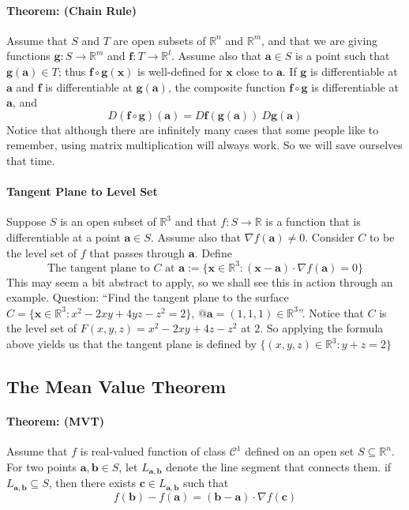 \documentclass[12pt]{article}
\newcommand{\real}{\mathbb{R}}
\newcommand{\va}{\mathbf{a}}
\newcommand{\vb}{\mathbf{b}}
\newcommand{\vx}{\mathbf{x}}
\newcommand{\vc}{\mathbf{c}}
\newcommand{\ba}{\mathbf{a}}
\newcommand{\boldf}{\mathbf{f}}
\newcommand{\bg}{\mathbf{g}}
\begin{document}
\paragraph{Theorem: (Chain Rule)} Assume that $S$ and $T$ are open subsets of $\real^n$ and $\real^m$, and that we are giving functions $\mathbf{g}:S\to \real^m$ and $\boldf: T\to \real^l$. Assume also that $\va\in S$ is a point such that $\mathbf{g}(\va)\in T$; thus $\boldf\circ \mathbf{g}(\vx)$ is well-defined for $\vx$ close to $\va$. If $\mathbf{g}$ is differentiable at $\va$ and $\boldf$ is differentiable at $\mathbf{g}(\va)$, the composite function $\boldf\circ\mathbf{g}$ is differentiable at $\va$, and
\begin{equation*}
    \boxed{ D(\boldf\circ\mathbf{g})(\ba) = D\boldf(\mathbf{g}(\ba)) \ D\bg(\ba)}
\end{equation*}
Notice that although there are infinitely many cases that some people like to remember, using matrix multiplication will always work. So we will save ourselves that time.

\paragraph{Tangent Plane to Level Set} Suppose $S$ is an open subset of $\real^3$ and that $f:S\to \real$ is a function that is differentiable at a point $\va\in S$. Assume also that $\nabla f(\va) \neq 0$. Consider $C$ to be the level set of $f$ that passes through $\va$. Define
\begin{equation*}
    \text{The tangent plane to $C$ at $\va$}:=\{ \vx\in \real^3:(\vx - \va)\cdot \nabla f(\va) = 0 \}
\end{equation*}
This may seem a bit abstract to apply, so we shall see this in action through an example. Question: ``Find the tangent plane to the surface $C = \{\vx\in \real^3: x^2 - 2xy + 4yz - z^2 = 2\}, \,@\va = (1,1,1)\in \real^3$''. Notice that $C$ is the level set of $F(x,y,z)=x^2-2xy+4z-z^2$ at $2$. So applying the formula above yields us that the tangent plane is defined by $\{ (x,y,z)\in\real^3:y+z=2\}$

\subsection{The Mean Value Theorem}
\paragraph{Theorem: (MVT)} Assume that $f$ is real-valued function of class $\mathcal{C}^1$ defined on an open set $S\subseteq \real^n$. For two points $\va,\vb\in S$, let $L_{\va,\vb}$ denote the line segment that connects them. if $L_{\va,\vb}\subseteq S$, then there exists $\vc\in L_{\va,\vb}$ such that
\begin{equation*}
    f(\vb)-f(\va)=(\vb-\va)\cdot\nabla f(\vc)
\end{equation*}
\end{document}
